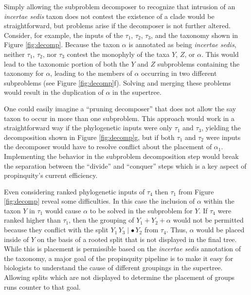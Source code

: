 \documentclass[english]{article}
\begin{document}
Simply allowing the subproblem decomposer to recognize that intrusion
    of an \emph{incertae sedis} taxon does not contest the existence
    of a clade would be straightforward, but problems arise if the
    decomposer is not further altered.
Consider, for example, the inputs of the $\tau_1$, $\tau_2$, $\tau_3$, and the taxonomy
    shown in Figure \ref{fig:decomp}.
Because the taxon $\alpha$ is annotated as being \emph{incertae sedis}, 
    neither  $\tau_1$, $\tau_2$, nor $\tau_3$ contest the monophyly of 
    the taxa $Y$, $Z$, or $\alpha$.
This would lead to the taxonomic portion of both the $Y$ and $Z$ subproblems
    containing the taxonomy for $\alpha$, leading to the members of
    $\alpha$ occurring in two different subproblems (see Figure \ref{fig:decomp}f).
Solving and merging these problems would result in the duplication of $\alpha$ 
    in the supertree.


One could easily
    imagine a ``pruning decomposer'' that does not allow the say taxon to
    occur in more than one subproblem.
This approach would work in a straightforward way if the phylogenetic inputs were only $\tau_1$ and $\tau_3$,
    yielding the decomposition shown in Figure \ref{fig:decomp}g, but if
    both $\tau_1$ and $\tau_2$ were inputs the decomposer would have to
    resolve conflict about the placement of $\alpha_1$.
Implementing the behavior in the subproblem decomposition step would
    break the separation between the ``divide'' and ``conquer'' steps
    which is a key aspect of propinquity's current efficiency.

Even considering ranked phylogenetic inputs of $\tau_4$ then $\tau_1$ from
    Figure \ref{fig:decomp} reveal some difficulties.
In this case the inclusion of $\alpha$ within the taxon $Y$ in $\tau_1$ would
    cause $\alpha$ to be solved in the subproblem for $Y$.
If $\tau_4$ were ranked higher than $\tau_1$, then the grouping of $Y_1+Y_2+\alpha$ would
    not be permitted because they conflict with the split $Y_1\,Y_3 \mid \bullet\,Y_2$ from
    $\tau_4$.
Thus, $\alpha$ would be placed inside of $Y$ on the basis of a rooted split
    that is not displayed in the final tree.
While this is placement is permissible based on the \emph{incertae sedis} annotation of the
    taxonomy, a major goal of the propinquity pipeline is to make it
    easy for biologists to understand the cause of different groupings in the 
    supertree.
Allowing splits which are not displayed to determine the placement of groups runs counter to that goal.
\end{document}
